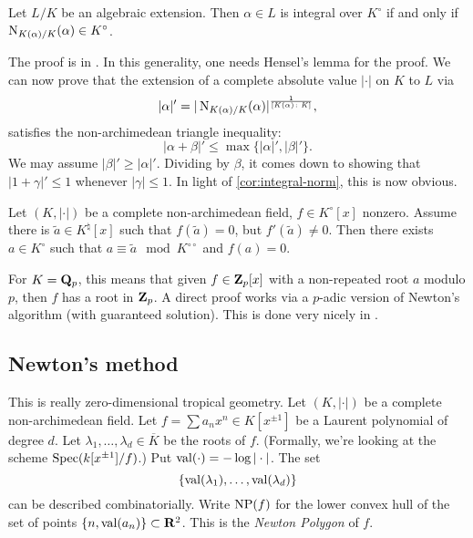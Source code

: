 \begin{corollary}\label{cor:integral-norm}
Let $L/K$ be an algebraic extension. Then $\alpha\in L$ is integral over 
$K^\circ$ if and only if $\operatorname{N}_{K(\alpha)/K}(\alpha)\in K^\circ$. 
\end{corollary}

The proof is in \cite{bosch-2014}. In this generality, one needs Hensel's lemma 
for the proof. We can now prove that the extension of a complete absolute 
value $|\cdot|$ on $K$ to $L$ via 
\[
  |\alpha|' = |\operatorname{N}_{K(\alpha)/K}(\alpha)|^{\frac{1}{[K(\alpha)\colon K]}} ,
\]
satisfies the non-archimedean triangle inequality: 
\[
  |\alpha+\beta|'\leqslant \max\{|\alpha|',|\beta|'\} .
\]
We may assume $|\beta|'\geqslant |\alpha|'$. Dividing by $\beta$, it comes 
down to showing that $|1+\gamma|'\leqslant 1$ whenever $|\gamma|\leqslant 1$. 
In light of \autoref{cor:integral-norm}, this is now obvious. 

\begin{corollary}
Let $(K,|\cdot|)$ be a complete non-archimedean field, $f\in K^\circ[x]$ 
nonzero. Assume there is $\tilde a\in K^\natural[x]$ such that $f(\tilde a)=0$, 
but $f'(\tilde a)\ne 0$. Then there exists $a\in K^\circ$ such that 
$a\equiv \tilde a\mod{K^{\circ\circ}}$ and $f(a)=0$. 
\end{corollary}

For $K=\mathbf{Q}_p$, this means that given $f\in \mathbf{Z}_p[x]$ with a non-repeated root 
$a$ modulo $p$, then $f$ has a root in $\mathbf{Z}_p$. A direct proof works via a 
$p$-adic version of Newton's algorithm (with guaranteed solution). This is 
done very nicely in \cite{gouvea-1997}. 





\subsection{Newton's method}

This is really zero-dimensional tropical geometry. Let $(K,|\cdot|)$ be a 
complete non-archimedean field. Let $f=\sum a_n x^n\in K[x^{\pm 1}]$ be a 
Laurent polynomial of degree $d$. Let 
$\lambda_1,\dots,\lambda_d\in \overline K$ be the roots of $f$. (Formally, 
we're looking at the scheme $\operatorname{Spec}(k[x^{\pm 1}]/f)$.) Put 
$\operatorname{val}(\cdot)=-\log|\cdot|$. The set 
\[
	\{\operatorname{val}(\lambda_1),\dots,\operatorname{val}(\lambda_d)\} 
\]
can be described combinatorially. Write $\operatorname{NP}(f)$ for the lower 
convex hull of the set of points $\{n,\operatorname{val}(a_n)\}\subset \mathbf{R}^2$. This is 
the \emph{Newton Polygon} of $f$. 

